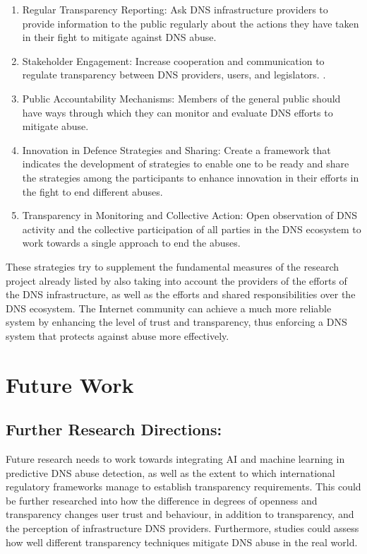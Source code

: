 \begin{enumerate}

    \item Regular Transparency Reporting: Ask DNS infrastructure providers to provide information to the public regularly about the actions they have taken in their fight to mitigate against DNS abuse.

    \item Stakeholder Engagement: Increase cooperation and communication to regulate transparency between DNS providers, users, and legislators. 
.
    \item Public Accountability Mechanisms: Members of the general public should have ways through which they can monitor and evaluate DNS efforts to mitigate abuse. 
    
    \item Innovation in Defence Strategies and Sharing: Create a framework that indicates the development of strategies to enable one to be ready and share the strategies among the participants to enhance innovation in their efforts in the fight to end different abuses.
    
    \item Transparency in Monitoring and Collective Action: Open observation of DNS activity and the collective participation of all parties in the DNS ecosystem to work towards a single approach to end the abuses.
    
\end{enumerate}

These strategies try to supplement the fundamental measures of the research project already listed by also taking into account the providers of the efforts of the DNS infrastructure, as well as the efforts and shared responsibilities over the DNS ecosystem. The Internet community can achieve a much more reliable system by enhancing the level of trust and transparency, thus enforcing a DNS system that protects against abuse more effectively.

\section{Future Work}

\subsection{Further Research Directions:} Future research needs to work towards integrating AI and machine learning in predictive DNS abuse detection, as well as the extent to which international regulatory frameworks manage to establish transparency requirements. This could be further researched into how the difference in degrees of openness and transparency changes user trust and behaviour, in addition to transparency, and the perception of infrastructure DNS providers. Furthermore, studies could assess how well different transparency techniques mitigate DNS abuse in the real world.

